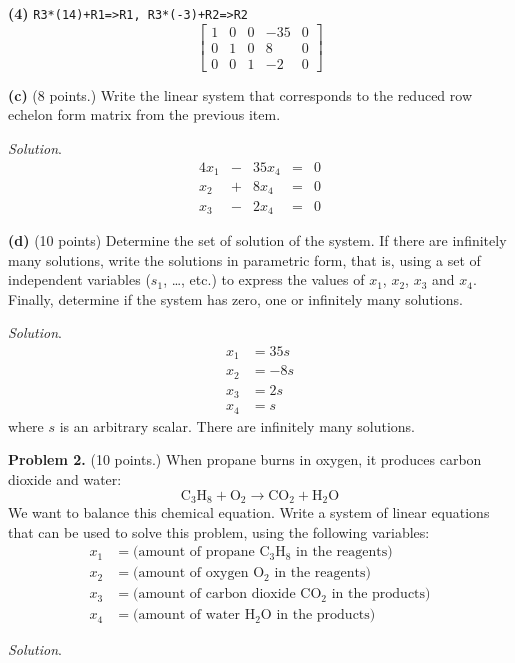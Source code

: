 \documentclass[12pt]{article}
\begin{document}
\textbf{(4)} \texttt{R3*(14)+R1=>R1, R3*(-3)+R2=>R2}
\[\left[\begin{matrix}1 & 0 & 0 & -35 & 0\\0 & 1 & 0 & 8 & 0\\0 & 0 & 1 & -2 & 0\end{matrix}\right]\]


\textbf{(c)} (8 points.) Write the linear system that corresponds to the reduced row echelon form matrix from the previous item.

\emph{Solution}.
\begin{alignat*}{4}
x_1 & {}-{} & 35x_4 & {}={} & 0\\
x_2 & {}+{} & 8x_4  & {}={} & 0\\
x_3 & {}-{} & 2x_4  & {}={} & 0
\end{alignat*}

\textbf{(d)} (10 points) Determine the set of solution of the system. If there are infinitely many solutions, write the solutions in parametric form, that is, using a set of independent variables ($s_1$, \dots, etc.) to express the values of $x_1$, $x_2$, $x_3$ and $x_4$. Finally, determine if the system has zero, one or infinitely many solutions.

\emph{Solution}.
\begin{align*}
x_1 &= 35s\\
x_2 &= -8s\\
x_3 &=  2s\\
x_4 &= s
\end{align*}
where $s$ is an arbitrary scalar. There are infinitely many solutions.

\textbf{Problem 2.} (10 points.)
When propane burns in oxygen, it produces carbon dioxide and water:
\[
\text{C}_3\text{H}_8 + \text{O}_2 \longrightarrow \text{C}\text{O}_2+\text{H}_2\text{O}
\]
We want to balance this chemical equation. Write a system of linear equations that can be used to solve this problem, using the following variables:
\begin{align*}
x_1 &= \text{(amount of propane $\text{C}_3\text{H}_8$ in the reagents)}\\
x_2 &= \text{(amount of oxygen $\text{O}_2$ in the reagents})\\
x_3 &= \text{(amount of carbon dioxide $\text{C}\text{O}_2$ in the products)}\\
x_4 &= \text{(amount of water $\text{H}_2\text{O}$ in the products)}
\end{align*}

\emph{Solution}.
\end{document}
